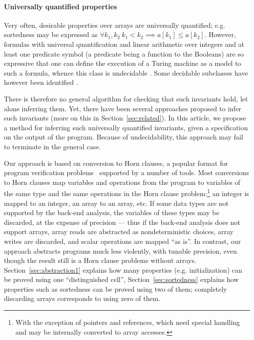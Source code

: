 \documentclass[a4paper]{article}
\theoremstyle{definition}
\theoremstyle{plain}
\begin{document}
\paragraph{Universally quantified properties}
Very often, desirable properties over arrays are universally quantified; e.g. sortedness may be expressed as
$\forall k_1,k_2~ k_1 < k_2 \implies a[k_1] \leq a[k_2]$.
However, formulas with universal quantification and linear arithmetic over integers and at least one predicate symbol (a predicate being a function to the Booleans) are so expressive that one can define the execution of a Turing machine as a model to such a formula, whence this class is undecidable \cite{Halpern91}.
Some decidable subclasses have however been identified \cite{BradleyMS06}.

There is therefore no general algorithm for checking that such invariants hold, let alone inferring them. Yet, there have been several approaches proposed to infer such invariants (more on this in Section~\ref{sec:related}).
In this article, we propose a method for inferring such universally quantified invariants, given a specification on the output of the program.
Because of undecidability, this approach may fail to terminate in the general case.

Our approach is based on conversion to Horn clauses, a popular format for program verification problems~\cite{DBLP:conf/vstte/RummerHK13} supported by a number of tools.
Most conversions to Horn clauses map variables and operations from the program to variables of the same type and the same operations in the Horn clause problem:\footnote{With the exception of pointers and references, which need special handling and may be internally converted to array accesses.}
an integer is mapped to an integer, an array to an array, etc. If some data types are not supported by the back-end analysis, the variables of these types may be discarded, at the expense of precision --- thus if the back-end analysis does not support arrays, array reads are abstracted as nondeterministic choices, array writes are discarded, and scalar operations are mapped ``as is''.
In contrast, our approach abstracts programs much less violently, with tunable precision, even though the result still is a Horn clause problems without arrays.
Section~\ref{sec:abstraction1} explains how many properties (e.g. initialization) can be proved using one ``distinguished cell'', Section~\ref{sec:sortedness} explains how properties such as sortedness can be proved using two of them; completely discarding arrays corresponds to using zero of them.
\end{document}
